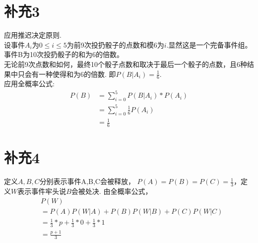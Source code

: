 \documentclass[a4paper,twocolumn]{ctexart}
\begin{document}
\section*{补充3}
\indent 应用推迟决定原则.\\
\indent 设事件$A_i$为$0\le i \le 5$为前9次投扔骰子的点数和模6为$i$.显然这是一个完备事件组。事件B为10次投扔骰子的和为6的倍数。\\
\indent 无论前9次点数和如何，最终10个骰子点数和取决于最后一个骰子的点数，且6种结果中只会有一种使得和为6的倍数.
即$P(B|A_i)=\frac{1}{6}$.\\
应用全概率公式:
\begin{align*}
P(B)&=\sum_{i=0}^{5}P(B|A_i)*P(A_i)\\
&=\sum_{i=0}^{5}\frac{1}{6}P(A_i)\\
&=\frac{1}{6}
\end{align*}
\section*{补充4}
定义$A,B,C$分别表示事件A,B,C会被释放，
$P(A)=P(B)=P(C)=\frac{1}{3}$，定义$W$表示事件牢头说$B$会被处决.
由全概率公式，
\begin{align*}
&P(W)\\
&=P(A)P(W|A)+P(B)P(W|B)+P(C)P(W|C)\\
&=\frac{1}{3}*p+\frac{1}{3}*0+\frac{1}{3}*1\\
&=\frac{p+1}{3}
\end{align*}
\end{document}
